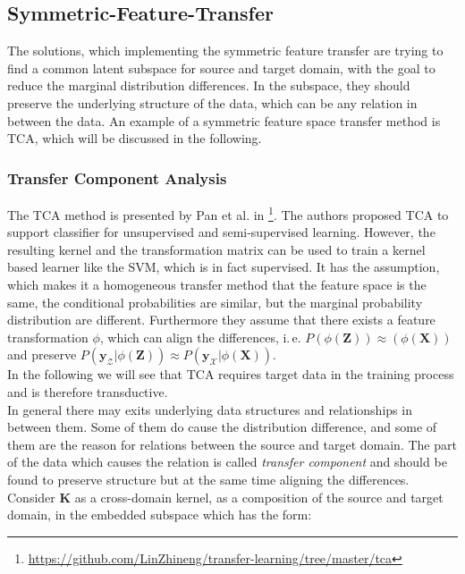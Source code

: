 \subsection{Symmetric-Feature-Transfer}\label{TlSubSecHomoSymFeature}
The solutions, which implementing the symmetric feature transfer are trying to find a common latent subspace for source and target domain, with the goal to reduce the marginal distribution differences.
In the subspace, they should preserve the underlying structure of the data, which can be any relation in between the data.
An example of a symmetric feature space transfer method is \ac{TCA}, which will be discussed in the following.\cite[p. 6]{Weiss.2016}
\subsubsection{Transfer Component Analysis}
The \acs{TCA} method is presented by Pan et al. in \cite{Pan.2011}\footnote{\url{https://github.com/LinZhineng/transfer-learning/tree/master/tca}}.
The authors proposed \acs{TCA} to support classifier for unsupervised and semi-supervised learning.\cite{Pan.2011}
However, the resulting kernel and the transformation matrix can be used to train a kernel based learner like the \acs{SVM}, which is in fact supervised.
It has the assumption, which makes it a homogeneous transfer method that the feature space is the same, the conditional probabilities are similar, but the marginal probability distribution are different.
Furthermore they assume that there exists a feature transformation $\phi$, which can align the differences, i.\,e. $P(\phi(\mathbf{Z})) \approx(\phi(\mathbf{X}))$ and preserve $P(\mathbf{y}_\mathcal{Z}\vert \phi(\mathbf{Z}))\approx P(\mathbf{y}_\mathcal{X}\vert \phi(\mathbf{X}))$.\cite{Pan.2011}\\
In the following we will see that \acs{TCA} requires target data in the training process and is therefore transductive.\\
In general there may exits underlying data structures and relationships in between them.
Some of them do cause the distribution difference, and some of them are the reason for relations between the source and target domain.
The part of the data which causes the relation is called \textit{transfer component} and should be found to preserve structure but at the same time aligning the differences.\cite{Pan.2011}\\
Consider $\mathbf{K}$ as a cross-domain kernel, as a composition of the source and target domain, in the embedded subspace which has the form:\cite{Pan.2011}
